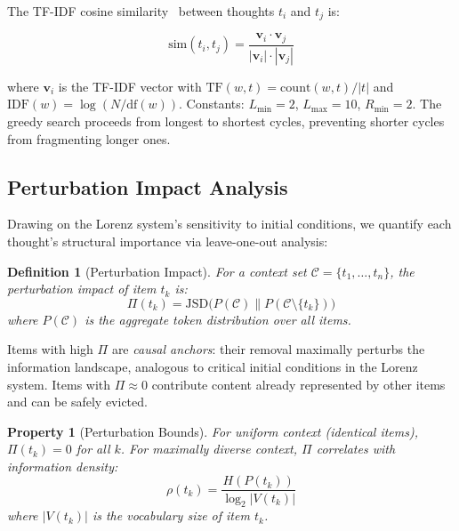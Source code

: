 \documentclass[journal,10pt]{IEEEtran}
\newtheorem{definition}{Definition}
\newtheorem{property}{Property}
\begin{document}
The TF-IDF cosine similarity~\cite{salton1988} between thoughts $t_i$ and $t_j$ is:

\begin{equation}
\mathrm{sim}(t_i, t_j) = \frac{\mathbf{v}_i \cdot \mathbf{v}_j}{|\mathbf{v}_i| \cdot |\mathbf{v}_j|}
\label{eq:cosine}
\end{equation}

\noindent where $\mathbf{v}_i$ is the TF-IDF vector with $\mathrm{TF}(w, t) = \mathrm{count}(w, t) / |t|$ and $\mathrm{IDF}(w) = \log(N / \mathrm{df}(w))$. Constants: $L_{\min} = 2$, $L_{\max} = 10$, $R_{\min} = 2$. The greedy search proceeds from longest to shortest cycles, preventing shorter cycles from fragmenting longer ones.

\subsection{Perturbation Impact Analysis}
\label{sec:perturbation}

Drawing on the Lorenz system's sensitivity to initial conditions, we quantify each thought's structural importance via leave-one-out analysis:

\begin{definition}[Perturbation Impact]
\label{def:perturbation}
For a context set $\mathcal{C} = \{t_1, \ldots, t_n\}$, the perturbation impact of item $t_k$ is:
\begin{equation}
\Pi(t_k) = \mathrm{JSD}\bigl(P(\mathcal{C}) \| P(\mathcal{C} \setminus \{t_k\})\bigr)
\label{eq:perturbation}
\end{equation}
where $P(\mathcal{C})$ is the aggregate token distribution over all items.
\end{definition}

Items with high $\Pi$ are \emph{causal anchors}: their removal maximally perturbs the information landscape, analogous to critical initial conditions in the Lorenz system. Items with $\Pi \approx 0$ contribute content already represented by other items and can be safely evicted.

\begin{property}[Perturbation Bounds]
\label{prop:bounds}
For uniform context (identical items), $\Pi(t_k) = 0$ for all $k$. For maximally diverse context, $\Pi$ correlates with information density:
\begin{equation}
\rho(t_k) = \frac{H(P(t_k))}{\log_2 |V(t_k)|}
\label{eq:density}
\end{equation}
where $|V(t_k)|$ is the vocabulary size of item $t_k$.
\end{property}
\end{document}
